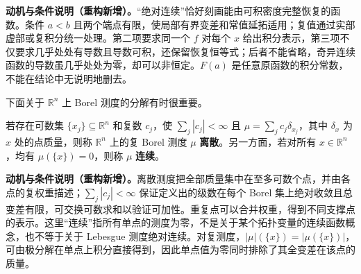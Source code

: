 \documentclass[../../main.tex]{subfiles}%
\begin{document}
\begin{remark}
\textbf{动机与条件说明（重构新增）。}“绝对连续”恰好刻画能由可积密度完整恢复的函数。条件 $a<b$ 且两个端点有限，使局部有界变差和常值延拓适用；复值通过实部虚部或复积分统一处理。第二项要求同一个 $f$ 对每个 $x$ 给出积分表示，第三项不仅要求几乎处处有导数且导数可积，还保留恢复恒等式；后者不能省略，奇异连续函数的导数虽几乎处处为零，却可以非恒定。$F(a)$ 是任意原函数的积分常数，不能在结论中无说明地删去。
\end{remark}

下面关于 $\mathbb R^n$ 上 Borel 测度的分解有时很重要。
\begin{definition}[离散测度与连续测度]\label{definition:ch03-discrete-continuous-measures}
若存在可数集 $\{x_j\}\subseteq\mathbb R^n$ 和复数 $c_j$，使 $\sum_j|c_j|<\infty$ 且 $\mu=\sum_jc_j\delta_{x_j}$，其中 $\delta_x$ 为 $x$ 处的点质量，则称 $\mathbb R^n$ 上的复 Borel 测度 $\mu$ \textbf{离散}。另一方面，若对所有 $x\in\mathbb R^n$，均有 $\mu(\{x\})=0$，则称 $\mu$ \textbf{连续}。
\end{definition}
\begin{remark}
\textbf{动机与条件说明（重构新增）。}离散测度把全部质量集中在至多可数个点，并由各点的复权重描述；$\sum_j|c_j|<\infty$ 保证定义出的级数在每个 Borel 集上绝对收敛且总变差有限，可交换可数求和以验证可加性。重复点可以合并权重，得到不同支撑点的表示。这里“连续”指所有单点的测度为零，不是关于某个拓扑变量的连续函数概念，也不等于关于 Lebesgue 测度绝对连续。对复测度，$|\mu|(\{x\})=|\mu(\{x\})|$，可由极分解在单点上积分直接得到，因此单点值为零同时排除了其全变差在该点的质量。
\end{remark}
\end{document}
